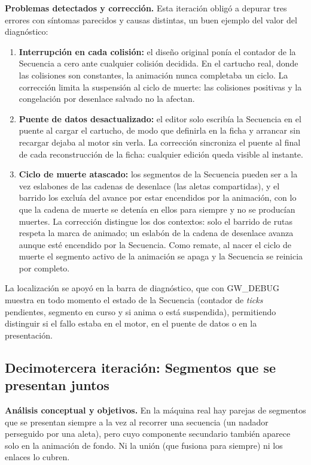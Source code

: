 \textbf{Problemas detectados y corrección.} Esta iteración obligó a
depurar tres errores con síntomas parecidos y causas distintas, un buen
ejemplo del valor del diagnóstico:

\begin{enumerate}
	\item \textbf{Interrupción en cada colisión:} el diseño original ponía
	el contador de la Secuencia a cero ante cualquier colisión decidida. En
	el cartucho real, donde las colisiones son constantes, la animación
	nunca completaba un ciclo. La corrección limita la suspensión al ciclo
	de muerte: las colisiones positivas y la congelación por desenlace
	salvado no la afectan.
	\item \textbf{Puente de datos desactualizado:} el editor solo escribía
	la Secuencia en el puente al cargar el cartucho, de modo que definirla
	en la ficha y arrancar sin recargar dejaba al motor sin verla. La
	corrección sincroniza el puente al final de cada reconstrucción de la
	ficha: cualquier edición queda visible al instante.
	\item \textbf{Ciclo de muerte atascado:} los segmentos de la Secuencia
	pueden ser a la vez eslabones de las cadenas de desenlace (las aletas
	compartidas), y el barrido los excluía del avance por estar encendidos
	por la animación, con lo que la cadena de muerte se detenía en ellos
	para siempre y no se producían muertes. La corrección distingue los
	dos contextos: solo el barrido de rutas respeta la marca de animado; un
	eslabón de la cadena de desenlace avanza aunque esté encendido por la
	Secuencia. Como remate, al nacer el ciclo de muerte el segmento activo
	de la animación se apaga y la Secuencia se reinicia por completo.
\end{enumerate}

La localización se apoyó en la barra de diagnóstico, que con GW\_DEBUG
muestra en todo momento el estado de la Secuencia (contador de
\textit{ticks} pendientes, segmento en curso y si anima o está
suspendida), permitiendo distinguir si el fallo estaba en el motor, en
el puente de datos o en la presentación.

\subsection{Decimotercera iteración: Segmentos que se presentan juntos}
\label{sec:F3Juntos}

\textbf{Análisis conceptual y objetivos.} En la máquina real hay
parejas de segmentos que se presentan siempre a la vez al recorrer una
secuencia (un nadador perseguido por una aleta), pero cuyo componente
secundario también aparece solo en la animación de fondo. Ni la unión
(que fusiona para siempre) ni los enlaces lo cubren.

